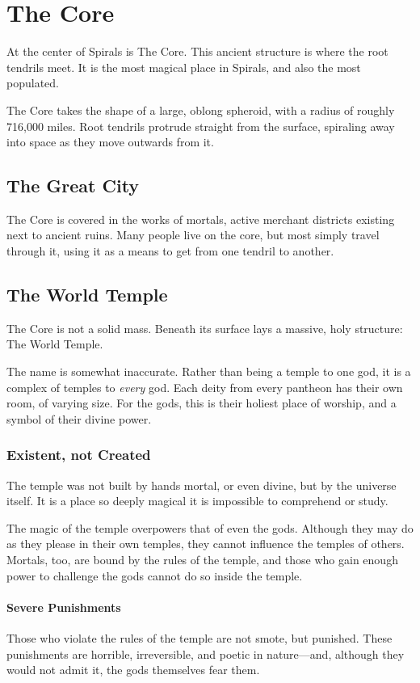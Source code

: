 \chapter{The Core}
At the center of Spirals is The Core.
This ancient structure is where the root tendrils meet.
It is the most magical place in Spirals, and also the most populated.

The Core takes the shape of a large, oblong spheroid, with a radius of roughly 716,000 miles.
Root tendrils protrude straight from the surface, spiraling away into space as they move outwards from it.

\begin{multicols}{2}
\section{The Great City}
The Core is covered in the works of mortals, active merchant districts existing next to ancient ruins.
Many people live on the core, but most simply travel through it, using it as a means to get from one tendril to another.


\section{The World Temple}
\label{worldtemple}
The Core is not a solid mass.
Beneath its surface lays a massive, holy structure: The World Temple.

The name is somewhat inaccurate.
Rather than being a temple to one god, it is a complex of temples to \textit{every} god.
Each deity from every pantheon has their own room, of varying size.
For the gods, this is their holiest place of worship, and a symbol of their divine power.

\subsection{Existent, not Created}
The temple was not built by hands mortal, or even divine, but by the universe itself.
It is a place so deeply magical it is impossible to comprehend or study.

The magic of the temple overpowers that of even the gods.
Although they may do as they please in their own temples, they cannot influence the temples of others.
Mortals, too, are bound by the rules of the temple, and those who gain enough power to challenge the gods cannot do so inside the temple.

\subsubsection{Severe Punishments}
Those who violate the rules of the temple are not smote, but punished.
These punishments are horrible, irreversible, and poetic in nature---and, although they would not admit it, the gods themselves fear them.


\end{multicols}
